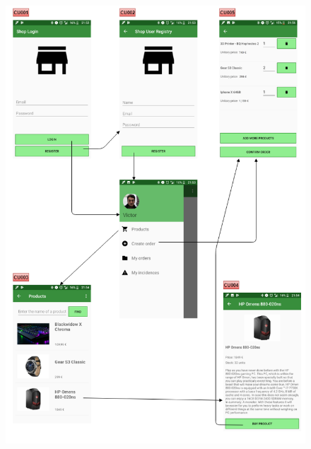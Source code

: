 \documentclass[11pt,spanish,listoffigures]{tfgetsinf}
\begin{document}
\begin{figure}[h]
\centering
\includegraphics[scale=0.6]{ModeloUI1}
\end{figure}
\end{document}
